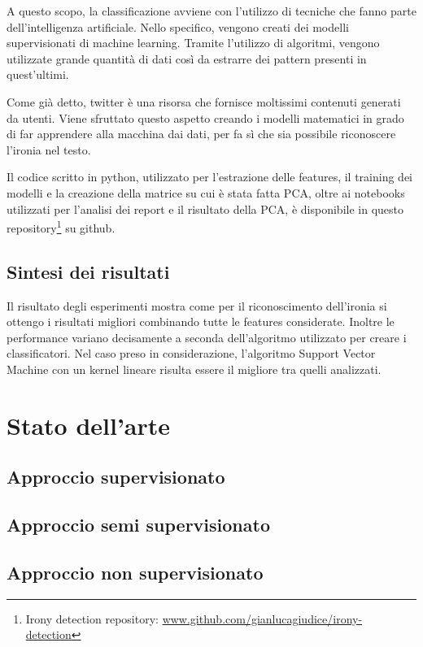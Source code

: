 \documentclass[oneside]{book}
\begin{document}
A questo scopo, la classificazione avviene con l'utilizzo di tecniche che fanno parte dell'intelligenza artificiale. Nello specifico, vengono creati dei modelli supervisionati di machine learning. Tramite l'utilizzo di algoritmi, vengono utilizzate grande quantità di dati così da estrarre dei pattern presenti in quest'ultimi.

Come già detto, twitter è una risorsa che fornisce moltissimi contenuti generati da utenti. Viene sfruttato questo aspetto creando i modelli matematici in grado di far apprendere alla macchina dai dati, per fa sì che sia possibile riconoscere l'ironia nel testo.

Il codice scritto in python, utilizzato per l'estrazione delle features, il training dei modelli e la creazione della matrice su cui è stata fatta PCA, oltre ai notebooks utilizzati per l'analisi dei report e il risultato della PCA, è disponibile in questo repository\footnote{Irony detection repository: \url{www.github.com/gianlucagiudice/irony-detection}} su github.

\section{Sintesi dei risultati}
Il risultato degli esperimenti mostra come per il riconoscimento dell'ironia si ottengo i risultati migliori combinando tutte le features considerate. Inoltre le performance variano decisamente a seconda dell'algoritmo utilizzato per creare i classificatori. Nel caso preso in considerazione, l'algoritmo Support Vector Machine con un kernel lineare risulta essere il migliore tra quelli analizzati.


\chapter{Stato dell'arte}

\section{Approccio supervisionato}

\section{Approccio semi supervisionato}

\section{Approccio non supervisionato}
\end{document}

